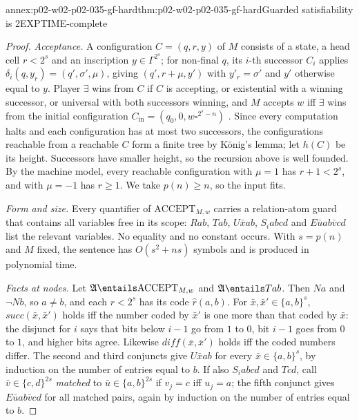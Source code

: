 \begin{annexitem}{annex:p02-w02-p02-035-gf-hard}{thm:p02-w02-p02-035-gf-hard}{Guarded satisfiability is 2EXPTIME-complete}
\begin{proof}
\emph{Acceptance.}  A configuration \(C=(q,r,y)\) of \(M\) consists of a
state, a head cell \(r<2^{s}\) and an inscription \(y\in\Gamma^{2^{s}}\); for
non-final \(q\), its \(i\)-th successor \(C_i\) applies
\(\delta_i(q,y_r)=(q',\sigma',\mu)\), giving \((q',r+\mu,y')\) with
\(y'_r=\sigma'\) and \(y'\) otherwise equal to \(y\).  Player \(\exists\)
wins from \(C\) if \(C\) is accepting, or existential with a winning
successor, or universal with both successors winning, and \(M\) accepts
\(w\) iff \(\exists\) wins from the initial configuration
\(C_{\mathrm{in}}=(q_0,0,w\square^{2^{s}-n})\) \cite[sect.~4.1]{Gradel1999}.
Since every computation halts and each configuration has at most two
successors, the configurations reachable from a reachable \(C\) form a
finite tree by K\"onig's lemma; let \(h(C)\) be its height.  Successors have
smaller height, so the recursion above is well founded.  By the machine
model, every reachable configuration with \(\mu=1\) has \(r+1<2^{s}\), and
with \(\mu=-1\) has \(r\geq1\).  We take \(p(n)\geq n\), so the input fits.

\emph{Form and size.}  Every quantifier of \(\mathrm{ACCEPT}_{M,w}\) carries
a relation-atom guard that contains all variables free in its scope: \(Rab\),
\(Tab\), \(U\bar xab\), \(S_iabcd\) and \(E\bar uab\bar vcd\) list the
relevant variables.  No equality and no constant occurs.  With \(s=p(n)\)
and \(M\) fixed, the sentence has \(O(s^2+ns)\) symbols and is produced in
polynomial time.

\emph{Facts at nodes.}  Let \(\mathfrak A\entails\mathrm{ACCEPT}_{M,w}\) and
\(\mathfrak A\entails Tab\).  Then \(Na\) and \(\neg Nb\), so \(a\neq b\), and
each \(r<2^{s}\) has its code \(\hat r(a,b)\).  For
\(\bar x,\bar x'\in\{a,b\}^{s}\), \(\mathit{succ}(\bar x,\bar x')\) holds iff
the number coded by \(\bar x'\) is one more than that coded by \(\bar x\):
the disjunct for \(i\) says that bits below \(i-1\) go from \(1\) to \(0\), bit
\(i-1\) goes from \(0\) to \(1\), and higher bits agree.  Likewise
\(\mathit{diff}(\bar x,\bar x')\) holds iff the coded numbers differ.  The
second and third conjuncts give \(U\bar xab\) for every
\(\bar x\in\{a,b\}^{s}\), by induction on the number of entries equal to
\(b\).  If also \(S_iabcd\) and \(Tcd\), call \(\bar v\in\{c,d\}^{2s}\)
\emph{matched} to \(\bar u\in\{a,b\}^{2s}\) if \(v_j=c\) iff \(u_j=a\); the
fifth conjunct gives \(E\bar uab\bar vcd\) for all matched pairs, again by
induction on the number of entries equal to \(b\).


\end{proof}
\end{annexitem}
